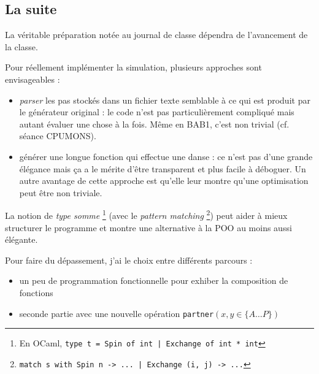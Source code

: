 \begin{teacheronly}
\section*{La suite}
La véritable préparation notée au journal de classe dépendra de l'avancement de
la classe.

Pour réellement implémenter la simulation, plusieurs approches sont
envisageables :
\begin{itemize}
\item \emph{parser} les pas stockés dans un fichier texte semblable à ce qui
	est produit par le générateur original : le code n'est pas particulièrement
	compliqué mais autant évaluer une chose à la fois. Même en BAB1, c'est non
	trivial (cf. séance CPUMONS).
\item générer une longue fonction qui effectue une danse : ce n'est pas d'une
	grande élégance mais ça a le mérite d'être transparent et plus facile à
	déboguer. Un autre avantage de cette approche est qu'elle leur montre
	qu'une optimisation peut être non triviale.
\end{itemize}

La notion de \emph{type somme}
\footnote{En OCaml, \texttt{type t = Spin of int | Exchange of int * int}}
(avec le \emph{pattern matching}
\footnote{\texttt{match s with Spin n -> ... | Exchange (i, j) -> ...}}) peut
aider à mieux structurer le programme et montre une alternative à la POO au
moins aussi élégante.

Pour faire du dépassement, j'ai le choix entre différents parcours :
\begin{itemize}
\item un peu de programmation fonctionnelle pour exhiber
	la composition de fonctions
\item seconde partie avec une nouvelle opération
	\texttt{partner}$(x, y\in\{A\dots P\})$
\end{itemize}
\end{teacheronly}


